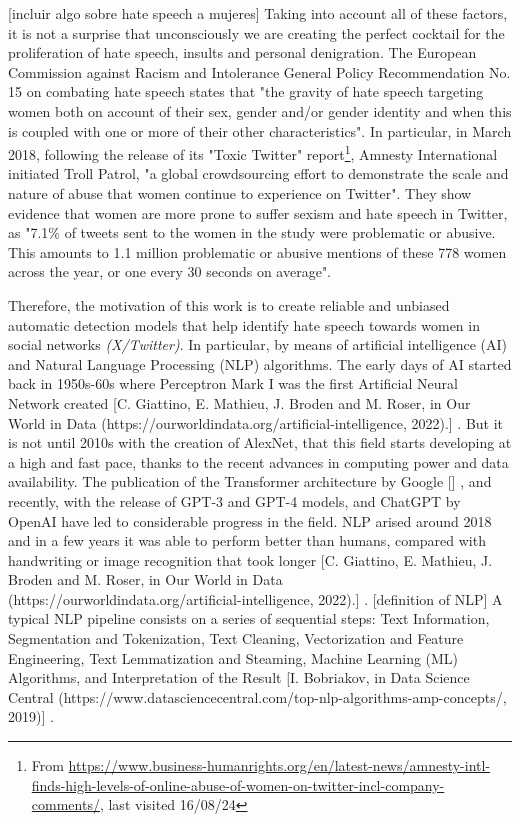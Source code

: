 \color{red}[incluir algo sobre hate speech a mujeres]\color{black} \newline
Taking into account all of these factors, it is not a surprise that unconsciously we are creating the perfect cocktail for the proliferation of hate speech, insults and personal denigration. The European Commission against Racism and Intolerance General Policy Recommendation No. 15 on combating hate speech states that "the gravity of hate speech targeting women both on account of their sex, gender and/or gender identity and when this is coupled with one or more of their other characteristics". In particular, in March 2018, following the release of its "Toxic Twitter" report\footnote{From \url{https://www.business-humanrights.org/en/latest-news/amnesty-intl-finds-high-levels-of-online-abuse-of-women-on-twitter-incl-company-comments/}, last visited 16/08/24}, Amnesty International initiated Troll Patrol, "a global crowdsourcing effort to demonstrate the scale and nature of abuse that women continue to experience on Twitter". They show evidence that women are more prone to suffer sexism and hate speech in Twitter, as "7.1\% of tweets sent to the women in the study were problematic or abusive. This amounts to 1.1 million problematic or abusive mentions of these 778 women across the year, or one every 30 seconds on average".

Therefore, the motivation of this work is to create reliable and unbiased automatic detection models that help identify hate speech towards women in social networks \textit{(X/Twitter)}. In particular, by means of artificial intelligence (AI) and Natural Language Processing (NLP) algorithms. The early days of AI started back in 1950s-60s where Perceptron Mark I was the first Artificial Neural Network created \color{blue} [C. Giattino, E. Mathieu, J. Broden and M. Roser, in Our World in Data (https://ourworldindata.org/artificial-intelligence, 2022).] \color{black}. But it is not until 2010s with the creation of AlexNet, that this field starts developing at a high and fast pace, thanks to the recent advances in computing power and data availability. The publication of the Transformer architecture by Google \color{blue} [] \color{black}, and recently, with the release of GPT-3 and GPT-4 models, and ChatGPT by OpenAI have led to considerable progress in the field. NLP arised around 2018 and in a few years it was able to perform better than humans, compared with handwriting or image recognition that took longer \color{blue} [C. Giattino, E. Mathieu, J. Broden and M. Roser, in Our World in Data (https://ourworldindata.org/artificial-intelligence, 2022).] \color{black}. \newline \color{red}[definition of NLP]\color{black} \newline
A typical NLP pipeline consists on a series of sequential steps: Text Information, Segmentation and Tokenization, Text Cleaning, Vectorization and Feature Engineering, Text Lemmatization and Steaming, Machine Learning (ML) Algorithms, and Interpretation of the Result \color{blue} [I. Bobriakov, in Data Science Central (https://www.datasciencecentral.com/top-nlp-algorithms-amp-concepts/, 2019)] \color{black}.